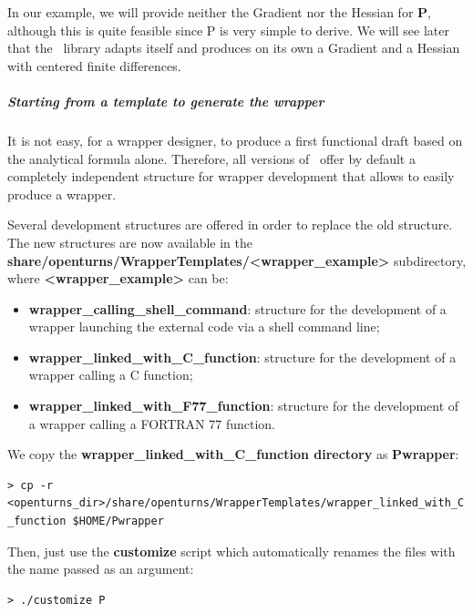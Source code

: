 In our example, we will provide neither the Gradient nor the Hessian for {\bf P}, although this is quite feasible since P is very simple to derive. We will see later that the \OT\ library adapts itself and produces on its own a Gradient and a Hessian with centered finite differences.

\subparagraph{Starting from a template to generate the wrapper}

It is not easy, for a wrapper designer, to produce a first functional draft based on the analytical formula alone. Therefore, all versions of \OT\ offer by default a completely independent structure for wrapper development that allows to easily produce a wrapper.

Several development structures are offered in order to replace the old structure. The new structures are now available in the {\bf share/openturns/WrapperTemplates/<wrapper\_example>} subdirectory, where {\bf {}<wrapper\_example>} can be:
\begin{itemize}
\item {\bf wrapper\_calling\_shell\_command}: structure for the development of a wrapper launching the external code via a shell command line;
\item {\bf wrapper\_linked\_with\_C\_function}: structure for the development of a wrapper calling a C function;
\item {\bf wrapper\_linked\_with\_F77\_function}: structure for the development of a wrapper calling a FORTRAN 77 function.
\end{itemize}

We copy the {\bf {}wrapper\_linked\_with\_C\_function directory} as {\bf Pwrapper}:

\lstset{language=Bash, basicstyle=\normalsize}
\begin{lstlisting}[frame=TBRL]
> cp -r <openturns_dir>/share/openturns/WrapperTemplates/wrapper_linked_with_C
_function $HOME/Pwrapper
\end{lstlisting}

Then, just use the {\bf customize} script which automatically renames the files with the name passed as an argument:

\lstset{language=Bash, basicstyle=\normalsize}
\begin{lstlisting}[frame=TBRL]
> ./customize P
\end{lstlisting}

